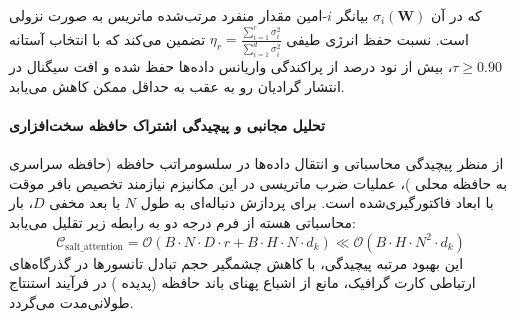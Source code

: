 که در آن $\sigma_i(\mathbf{W})$ بیانگر $i$-امین مقدار منفرد مرتب‌شده ماتریس به صورت نزولی است. نسبت حفظ انرژی طیفی $\eta_r = \frac{\sum_{i=1}^r \sigma_i^2}{\sum_{i=1}^{d} \sigma_i^2}$ تضمین می‌کند که با انتخاب آستانه $\tau \ge 0.90$، بیش از نود درصد از پراکندگی واریانس داده‌ها حفظ شده و افت سیگنال در انتشار گرادیان رو به عقب به حداقل ممکن کاهش می‌یابد.

\paragraph{تحلیل مجانبی و پیچیدگی اشتراک حافظه سخت‌افزاری}
از منظر پیچیدگی محاسباتی و انتقال داده‌ها در سلسومراتب حافظه (حافظه سراسری  به حافظه محلی )، عملیات ضرب ماتریسی در این مکانیزم نیازمند تخصیص بافر موقت با ابعاد فاکتورگیری‌شده است. برای پردازش دنباله‌ای به طول $N$ با بعد مخفی $D$، بار محاسباتی هسته از فرم درجه دو به رابطه زیر تقلیل می‌یابد:
\begin{equation}
\label{eq:complexity_salt_attention}
\mathcal{C}_{\text{salt\_attention}} = \mathcal{O}\left( B \cdot N \cdot D \cdot r + B \cdot H \cdot N \cdot d_k \right) \ll \mathcal{O}\left( B \cdot H \cdot N^2 \cdot d_k \right)
\end{equation}
این بهبود مرتبه پیچیدگی، با کاهش چشمگیر حجم تبادل تانسورها در گذرگاه‌های ارتباطی کارت گرافیک، مانع از اشباع پهنای باند حافظه (پدیده ) در فرآیند استنتاج طولانی‌مدت می‌گردد.
